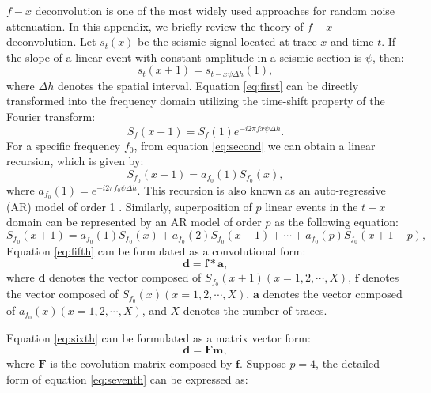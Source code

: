 $f-x$ deconvolution is one of the most widely used approaches for random noise attenuation. In this appendix, we briefly review the theory of $f-x$ deconvolution. Let $s_t(x)$ be the seismic signal located at trace $x$ and time $t$. If the slope of a linear event with constant amplitude in a seismic section is $\psi$, then:
\begin{equation}
\label{eq:first}
s_t(x+1)=s_{t-x\psi\Delta h}(1),
\end{equation}
where $\Delta h$ denotes the spatial interval. Equation \ref{eq:first} can be directly transformed into the frequency domain utilizing the time-shift property of the Fourier transform:
\begin{equation}
\label{eq:second}
S_f(x+1)=S_f(1)e^{-i2\pi fx\psi\Delta h}.
\end{equation}
For a specific frequency $f_0$,  from equation \ref{eq:second} we can  obtain a linear recursion, which is given by:
\begin{equation}
\label{eq:third}
S_{f_0}(x+1)=a_{f_0}(1)S_{f_0}(x),
\end{equation}
where  $a_{f_0}(1)=e^{-i2\pi f_0\psi\Delta h}$. 
This recursion is also known as an auto-regressive (AR) model of order 1 \cite[]{canales}. Similarly, superposition of $p$ linear events in the $t-x$ domain can be represented by an AR model of order $p$ \cite[]{tufts,har} as the following equation:
\begin{equation}
\label{eq:fifth}
S_{f_0}(x+1)=a_{f_0}(1)S_{f_0}(x)+a_{f_0}(2)S_{f_0}(x-1)+\cdots+a_{f_0}(p)S_{f_0}(x+1-p),
\end{equation}
Equation \ref{eq:fifth} can be formulated as a convolutional form:
\begin{equation}
\label{eq:sixth}
\mathbf{d}=\mathbf{f}*\mathbf{a},
\end{equation}
where $\mathbf{d}$ denotes the vector composed of $S_{f_0}(x+1)(x=1,2,\cdots,X)$, $\mathbf{f}$ denotes the vector composed of $S_{f_0}(x)(x=1,2,\cdots,X)$, $\mathbf{a}$ denotes the vector composed of $a_{f_0}(x)(x=1,2,\cdots,X)$, and $X$ denotes the number of traces.

Equation \ref{eq:sixth} can be formulated as a matrix vector form:
\begin{equation}
\label{eq:seventh}
\mathbf{d}=\mathbf{Fm},
\end{equation}
where $\mathbf{F}$ is the covolution matrix composed by $\mathbf{f}$. Suppose $p=4$, the detailed form of equation \ref{eq:seventh} can be expressed as:

